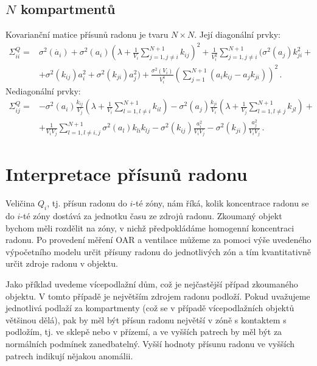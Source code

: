 \subsection{$N$ kompartmentů}
Kovarianční matice přísunů radonu je tvaru $N\times N$. Její diagonální prvky:
\begin{align}
    \Sigma_{ii}^Q=&\sigma^2(\dot{a_i}) + \sigma^2(a_i)\left(\lambda + \frac{1}{V_i}\sum_{j=1,j\neq i}^{N+1}k_{ij}\right)^2 + \frac{1}{V_i^2}\sum_{j=1,j\neq i}^{N+1}\big(\sigma^2(a_j)k_{ji}^2 + \nonumber\\
    &+ \sigma^2(k_{ij})a_i^2 + \sigma^2(k_{ji})a_j^2\big) + \frac{\sigma^2(V_i)}{V_i^4}\left(\sum_{j=1}^{N+1}\left(a_i k_{ij} -a_j k_{ji}\right)\right)^2\,.
    \label{eq:nejistota_Nzon}
\end{align}
Nediagonální prvky:
\begin{align}
    \Sigma_{ij}^Q=&-\sigma^2(a_i)\frac{k_{ij}}{V_j}\left(\lambda + \frac{1}{V_i}\sum_{l=1,l\neq i}^{N+1}k_{il}\right) - \sigma^2(a_j)\frac{k_{ji}}{V_i}\left(\lambda + \frac{1}{V_j}\sum_{l=1,l\neq j}^{N+1}k_{jl}\right)+\nonumber\\
    &+ \frac{1}{V_iV_j}\sum_{l=1,l\neq i,j}^{N+1}\sigma^2(a_l)k_{li}k_{lj} - \sigma^2(k_{ij})\frac{a_i^2}{V_iV_j} - \sigma^2(k_{ji})\frac{a_j^2}{V_iV_j}\,.
\end{align}

\section{Interpretace přísunů radonu}\label{navesti:model_interpretace_Q}
Veličina $Q_i$, tj. přísun radonu do $i$-té zóny, nám říká, kolik koncentrace radonu se do $i$-té zóny dostává za jednotku času ze zdrojů radonu. Zkoumaný objekt bychom měli rozdělit na zóny, v nichž předpokládáme homogenní koncentraci radonu. Po provedení měření OAR a ventilace můžeme za pomoci výše uvedeného výpočetního modelu určit přísuny radonu do jednotlivých zón a tím kvantitativně určit zdroje radonu v objektu.

Jako příklad uvedeme vícepodlažní dům, což je nejčastější případ zkoumaného objektu. V tomto případě je největším zdrojem radonu podloží. Pokud uvažujeme jednotlivá podlaží za kompartmenty (což se v případě vícepodlažních objektů většinou dělá), pak by měl být přísun radonu největší v zóně s kontaktem s podložím, tj. ve sklepě nebo v přízemí, a ve vyšších patrech by měl být za normálních podmínek zanedbatelný. Vyšší hodnoty přísunu radonu ve vyšších patrech indikují nějakou anomálii.

